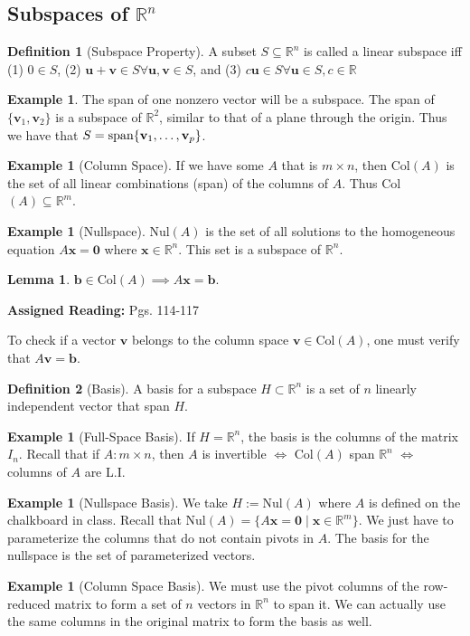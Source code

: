 \documentclass{article}
\numberwithin{equation}{section}
\theoremstyle{definition}
\newtheorem{defn}{Definition}[subsection]
\newtheorem{ex}[thm]{Example}
\newtheorem{lemma}[thm]{Lemma}
\newcommand{\V}{\mathbf{v}}
\newcommand{\U}{\mathbf{u}}
\newcommand{\R}{\mathbb{R}}
\let\oldforall\forall
\renewcommand{\forall}{\mathrel{\oldforall}}
\newcommand{\x}{\times}
\theoremstyle{adefn}
\begin{document}
	\subsection{Subspaces of $\R^n$}
	\begin{defn}[Subspace Property]
		A subset $S \subseteq \R^n$ is called a linear subspace iff (1) $0 \in S$, (2) $\U + \V \in S \forall \U, \V \in S$, and (3) $c\U \in S \forall \U \in S, c \in \R$
	\end{defn}
	\begin{ex}
		The span of one nonzero vector will be a subspace. The span of $\{ \V_1, \V_2 \}$ is a subspace of $\R^2$, similar to that of a plane through the origin. Thus we have that $S = \hbox{span}\{ \V_1, \ldots, \V_p \}$.
	\end{ex}
	\begin{ex}[Column Space]
		If we have some $A$ that is $m \x n$, then Col$(A)$ is the set of all linear combinations (span) of the columns of $A$. Thus Col$(A) \subseteq \R^m$.  
	\end{ex}
	\begin{ex}[Nullspace]
		Nul$(A)$ is the set of all solutions to the homogeneous equation $A\mathbf{x} = \mathbf{0}$ where $\mathbf{x} \in \R^n$. This set is a subspace of $\R^n$. 
	\end{ex}
	\begin{lemma}
		$\mathbf{b} \in \text{Col}(A) \implies A\mathbf{x} = \mathbf{b}$. 
	\end{lemma}
	
	\begin{framed}
		\textbf{Assigned Reading: } Pgs. 114-117
	\end{framed}
	
	To check if a vector $\V$ belongs to the column space $\V \in \text{Col}(A)$, one must verify that $A\V = \mathbf{b}$. 
	
	\begin{defn}[Basis]
		A basis for a subspace $H \subset \R^n$ is a set of $n$ linearly independent vector that span $H$. 
	\end{defn}
	\begin{ex}[Full-Space Basis]
		If $H = \R^n$, the basis is the columns of the matrix $I_n$. Recall that if $A: m \x n$, then $A$ is invertible $\iff$ Col$(A)$ span $\R^n$ $\iff$ columns of $A$ are L.I.
	\end{ex}
	\begin{ex}[Nullspace Basis]
		We take $H := \text{Nul}(A)$ where $A$ is defined on the chalkboard in class. Recall that Nul$(A) = \{ A\mathbf{x} = \textbf{0} \mid \mathbf{x} \in \R^m \}$. We just have to parameterize the columns that do not contain pivots in $A$. The basis for the nullspace is the set of parameterized vectors. 
	\end{ex}
	\begin{ex}[Column Space Basis]
		We must use the pivot columns of the row-reduced matrix to form a set of $n$ vectors in $\R^n$ to span it. We can actually use the same columns in the original matrix to form the basis as well. 
	\end{ex}
	
\end{document}
